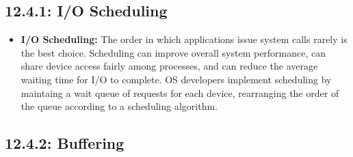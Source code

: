 \documentclass[12pt]{article}
\begin{document}
\subsection*{12.4.1: I/O Scheduling}

\begin{itemize}
    \item \textbf{I/O Scheduling:} The order in which applications issue system calls rarely is the best choice. Scheduling can improve overall system performance, can share device access fairly among processes, and can reduce the average waiting time for I/O to complete. OS developers implement scheduling by maintaing a wait queue of requests for each device, rearranging the order of the queue according to a scheduling algorithm.
\end{itemize}

\subsection*{12.4.2: Buffering}
\end{document}
